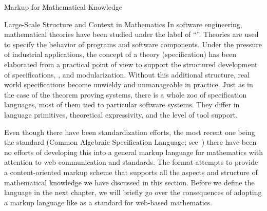 \begin{omgroup}[id=math-markup]{Markup for Mathematical Knowledge}
\begin{module}[id=math-context]
\begin{omgroup}[id=meta-theories]{Large-Scale Structure and Context in Mathematics}
  In software engineering, mathematical theories have been studied under the label of
  ``''. Theories are used to
  specify the behavior of programs and software components. Under the pressure of
  industrial applications, the concept of a theory (specification) has been elaborated
  from a practical point of view to support the structured development of specifications,
  {}, and modularization.  Without this additional structure, real
  world specifications become unwieldy and unmanageable in practice. Just as in the case
  of the theorem proving systems, there is a whole zoo of specification languages, most of
  them tied to particular software systems.  They differ in language primitives,
  theoretical expressivity, and the level of tool support.

  Even though there have been standardization efforts, the most recent one being the
  {\casl} standard (Common Algebraic Specification Language; see~\cite{CoFI:2004:CASL-RM}) there have
  been no efforts of developing this into a general markup language for mathematics with
  attention to web communication and standards. The {\omdoc} format attempts to provide a
  content-oriented markup scheme that supports all the aspects and structure of
  mathematical knowledge we have discussed in this section. Before we define the language
  in the next chapter, we will briefly go over the consequences of adopting a markup
  language like {\omdoc} as a standard for web-based mathematics.
\end{omgroup}
\end{module}
\end{omgroup}



